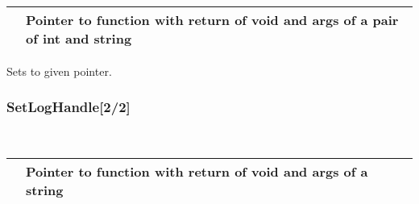 \documentclass[letterpaper,10pt,english]{sphinxmanual}
\begin{document}
\begin{fulllineitems}
\label{\detokenize{log:_CPPv2N6pessum12SetLogHandleEPFvNSt4pairIiNSt6stringEEEE}}%
\pysigstartmultiline
{}%
\pysigstopmultiline~

\begin{savenotes}\sphinxattablestart
\centering
\begin{tabulary}{\linewidth}[t]{|T|T|}
\hline

&
Pointer to function with return of void and args of a pair of int and string
\\
\hline
\end{tabulary}
\par
\sphinxattableend\end{savenotes}

Sets {\hyperref[\detokenize{log:_CPPv2N6pessum15log_handle_fullE}]{}} to given pointer.

\end{fulllineitems}



\subsubsection{SetLogHandle{[}2/2{]}}
\label{\detokenize{log:setloghandle-2-2}}

\begin{fulllineitems}
\label{\detokenize{log:_CPPv2N6pessum12SetLogHandleEPFvNSt6stringEE}}%
\pysigstartmultiline
{}%
\pysigstopmultiline~

\begin{savenotes}\sphinxattablestart
\centering
\begin{tabulary}{\linewidth}[t]{|T|T|}
\hline

&
Pointer to function with return of void and args of a string
\\
\hline
\end{tabulary}
\par
\sphinxattableend\end{savenotes}

\end{fulllineitems}
\end{document}
